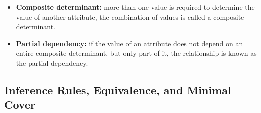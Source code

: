 \documentclass[10pt]{article}
\newcommand{\tf}{\textbf}
\begin{document}
\begin{enumerate}
\begin{enumerate}
		\begin{itemize}
			\item \tf{Composite determinant:}  more than one value is required to determine the value of another attribute, the combination of values is called a composite determinant.
			\item \tf{Partial dependency:} if the value of an attribute does not depend on an entire composite determinant, but only part of it, the relationship is known as the partial dependency.
		\end{itemize}
	\end{enumerate}
\end{enumerate}

\subsection{Inference Rules, Equivalence, and Minimal Cover}
\end{document}
